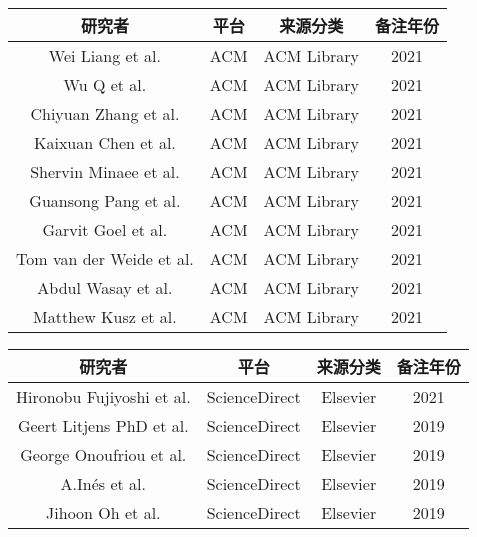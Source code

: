 \begin{center}
\begin{tabular}{cccc}
\hline
研究者 & 平台 & 来源分类 & 备注年份  \\
\hline
Wei Liang et al. \cite{weiliang2021} & ACM & ACM Library & 2021 \\
Wu Q et al. \cite{wuq2021} & ACM & ACM Library & 2021 \\
Chiyuan Zhang et al. \cite{chiyuanzhang2021} & ACM & ACM Library & 2021 \\
Kaixuan Chen et al. \cite{kaixuanchen2021} & ACM & ACM Library & 2021 \\
Shervin Minaee et al. \cite{shervinminaee2021} & ACM & ACM Library & 2021 \\
Guansong Pang et al. \cite{guansongpang2021} & ACM & ACM Library & 2021 \\
Garvit Goel et al. \cite{garvitgoel2021} & ACM & ACM Library & 2021 \\
Tom van der Weide et al. \cite{tomvanderweide2017} & ACM & ACM Library & 2021 \\
Abdul Wasay et al. \cite{abdulwasay2021} & ACM & ACM Library & 2021 \\
Matthew Kusz et al. \cite{matthewkusz2021} & ACM & ACM Library & 2021 \\
\hline
\end{tabular}
\end{center}

\begin{center}
\begin{tabular}{cccc}
\hline
研究者 & 平台 & 来源分类 & 备注年份  \\
\hline
Hironobu Fujiyoshi et al. \cite{fujiyoshi2021} & ScienceDirect & Elsevier & 2021 \\
Geert Litjens PhD et al. \cite{geertlitjens2019} & ScienceDirect & Elsevier & 2019 \\
George Onoufriou et al. \cite{george2019} & ScienceDirect & Elsevier & 2019 \\
A.Inés et al. \cite{aines2019} & ScienceDirect & Elsevier & 2019 \\
Jihoon Oh et al. \cite{jihoonoh2019} & ScienceDirect & Elsevier & 2019 \\
\hline
\end{tabular}
\end{center}

